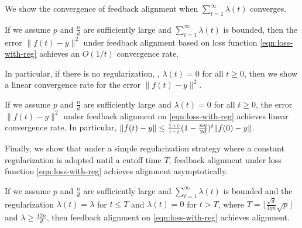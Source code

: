 We show the convergence of feedback alignment when $\sum_{t=1}^\infty \lambda(t)$ converges. 
\begin{theorem}[informal]
    If we assume $p$ and $\frac{n}{d}$ are sufficiently large and $\sum_{t=1}^\infty \lambda(t)$ is bounded, then the error $\|f(t) - y\|^2$ under feedback alignment based on loss function \eqref{eqn:loss-with-reg} achieves an $O(1/t)$ convergence rate.
\end{theorem}
In particular, if there is no regularization, \ie, $\lambda(t)=0$ for all $t\geq 0$, then we show a linear convergence rate for the error $\|f(t) - y\|^2$.
\begin{corollary}[informal]
    If we assume $p$ and $\frac{n}{d}$ are sufficiently large and $\lambda(t) = 0$ for all $t\geq 0$, the error $\|f(t) - y\|^2$ under feedback alignment on \eqref{eqn:loss-with-reg} achieves linear convergence rate. In particular, $\|f(t) - y\| \leq \frac{1+\varepsilon}{1-\varepsilon}(1-\frac{n\eta}{2d})^t \|f(0) - y\|$.
\end{corollary}
Finally, we show that under a simple regularization strategy where a constant regularization is adopted until a cutoff time $T$, feedback alignment under loss function \eqref{eqn:loss-with-reg} achieves alignment asymptotically.
\begin{theorem}[informal]
    If we assume $p$ and $\frac{n}{d}$ are sufficiently large and $\sum_{t=1}^\infty \lambda(t)$ is bounded and the regularization $\lambda(t) = \lambda$ for $t\leq T$ and $\lambda(t) = 0$ for $t>T$, where $T = \lfloor \frac{\sqrt{d}}{4\eta n}\sqrt{p} \rfloor$ and $\lambda \geq \frac{12n}{d}$,
    then feedback alignment on \eqref{eqn:loss-with-reg} achieves alignment.
\end{theorem}


